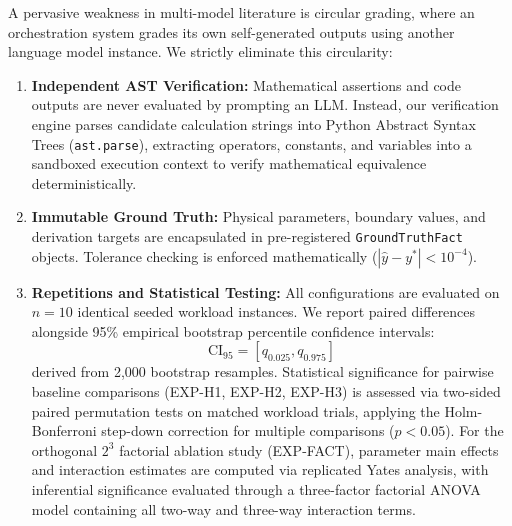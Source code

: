 A pervasive weakness in multi-model literature is circular grading, where an orchestration system grades its own self-generated outputs using another language model instance. We strictly eliminate this circularity:
\begin{enumerate}
    \item \textbf{Independent AST Verification:} Mathematical assertions and code outputs are never evaluated by prompting an LLM. Instead, our verification engine parses candidate calculation strings into Python Abstract Syntax Trees (\texttt{ast.parse}), extracting operators, constants, and variables into a sandboxed execution context to verify mathematical equivalence deterministically.
    \item \textbf{Immutable Ground Truth:} Physical parameters, boundary values, and derivation targets are encapsulated in pre-registered \texttt{GroundTruthFact} objects. Tolerance checking is enforced mathematically ($|\hat{y} - y^*| < 10^{-4}$).
    \item \textbf{Repetitions and Statistical Testing:} All configurations are evaluated on $n = 10$ identical seeded workload instances. We report paired differences alongside 95\% empirical bootstrap percentile confidence intervals:
    \begin{equation}
    \text{CI}_{95} = [q_{0.025}, q_{0.975}]
    \end{equation}
    derived from 2,000 bootstrap resamples. Statistical significance for pairwise baseline comparisons (EXP-H1, EXP-H2, EXP-H3) is assessed via two-sided paired permutation tests on matched workload trials, applying the Holm-Bonferroni step-down correction for multiple comparisons ($p < 0.05$). For the orthogonal $2^3$ factorial ablation study (EXP-FACT), parameter main effects and interaction estimates are computed via replicated Yates analysis, with inferential significance evaluated through a three-factor factorial ANOVA model containing all two-way and three-way interaction terms.
\end{enumerate}
